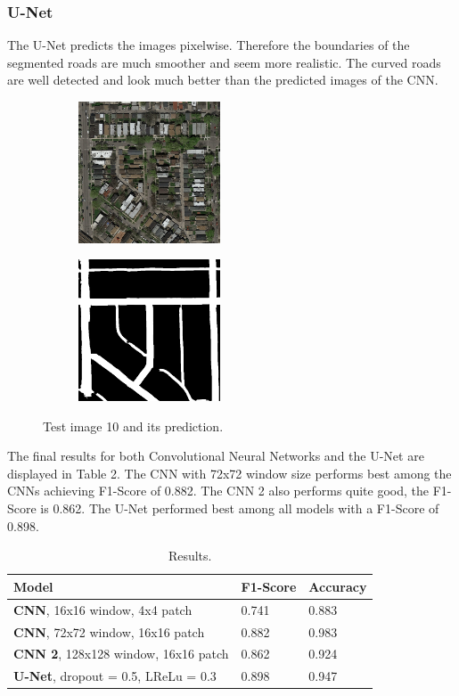 \documentclass[10pt,conference,compsocconf]{IEEEtran}
\begin{document}
\subsubsection{U-Net}
The U-Net predicts the images pixelwise. Therefore the boundaries of the segmented roads are much smoother and seem more realistic. The curved roads are well detected and look much better than the predicted images of the CNN.
\begin{figure}[htbp]
	\centering
	\begin{subfigure}[htb]{0.2\textwidth}
		\includegraphics[width=4.2cm]{images/test_10.png}
		\label{fig:unettest}
	\end{subfigure}
	\hspace{1.5em}
	\begin{subfigure}[htb]{0.2\textwidth}
		\includegraphics[width=4.2cm]{images/pred_10_unet.png}
		\label{fig:unetpred}
	\end{subfigure}
	\caption{Test image 10 and its prediction.}
\end{figure}

The final results for both Convolutional Neural Networks and the U-Net are displayed in Table 2. The CNN with 72x72 window size performs best among the CNNs achieving F1-Score of 0.882. The CNN 2 also performs quite good, the F1-Score is 0.862. The U-Net performed best among all models with a F1-Score of 0.898.

\begin{table}[htbp]
	\centering
	\begin{tabular}[c]{|l||l|l|}
		\hline
		\textbf{Model}&\textbf{F1-Score}&\textbf{Accuracy}\\
		\hline
		\textbf{CNN}, 16x16 window, 4x4 patch&0.741&0.883\\
	 	\textbf{CNN}, 72x72 window, 16x16 patch&0.882&0.983\\
	 	\textbf{CNN 2}, 128x128 window, 16x16 patch&0.862&0.924\\
		\textbf{U-Net}, dropout = 0.5, LReLu = 0.3 &0.898&0.947\\
		\hline
	\end{tabular}
	\caption{Results.}
	\label{tab:results}
\end{table}
\end{document}
